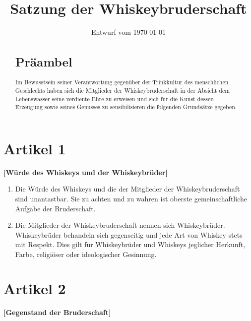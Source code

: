 \documentclass[a4paper,12pt]{scrartcl}
\title{Satzung der Whiskeybruderschaft}
\date{Entwurf vom \today}
\begin{document}
\maketitle

\clearpage

\vspace*{\fill}

\begin{abstract}
\section*{Präambel}
Im Bewusstsein seiner Verantwortung gegenüber der Trinkkultur des menschlichen Geschlechts haben
sich die Mitglieder der Whiskeybruderschaft in der Absicht dem Lebenswasser seine verdiente Ehre zu
erweisen und sich für die Kunst dessen Erzeugung sowie seines Genusses zu sensibilisieren die
folgenden Grundsätze gegeben.
\end{abstract}

\vspace*{\fill}
%
\clearpage


\section{Artikel 1}
\label{sec:würde}
\textbf{[Würde des Whiskeys und der Whiskeybrüder]}

\begin{enumerate}

\item Die Würde des Whiskeys und die der Mitglieder der Whiskeybruderschaft sind unantastbar. Sie zu
  achten und zu wahren ist oberste gemeinschaftliche Aufgabe der Bruderschaft.

\item Die Mitglieder der Whiskeybruderschaft nennen sich Whiskeybrüder. Whiskeybrüder behandeln sich
  gegenseitig und jede Art von Whiskey stets mit Respekt. Dies gilt für Whiskeybrüder und Whiskeys
  jeglicher Herkunft, Farbe, religiöser oder ideologischer Gesinnung.

\end{enumerate}



\section{Artikel 2}
\label{sec:gegenstand}
\textbf{[Gegenstand der Bruderschaft]}
\end{document}
